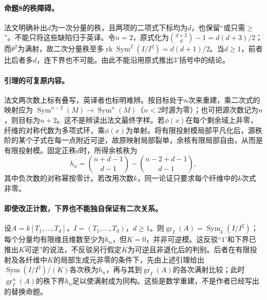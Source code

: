 \documentclass[openany,fontset=fandol]{ctexbook}
\newcommand{\Sym}{\operatorname{Sym}}
\newcommand{\gr}{\operatorname{gr}}
\begin{document}
\paragraph{命题8的秩障碍。}
法文明确补出$d$为一次分量的秩，且两项的二项式下标均为$d$，也保留“或只需$\ge$”。不能只将这些缺陷归于英译。令$n=2$，原式化为$\binom{d+2}{d}-1=d(d+3)/2$；而$\theta^2$为满射，故二次分量秩至多$\operatorname{rk}\Sym^2(I/I^2)=d(d+1)/2$。当$d\ge1$，前者比后者多$d$，连下界也不可能。由此不能沿用原式推出$3^\circ$括号中的结论。

\paragraph{引理的可复原内容。}
法文两次数上标有叠写，英译者也标明难辨。按目标处于$n$次来重建，乘二次式的映射应为
$\Sym^{n-2}(M)\to\Sym^n(M)$（$n<2$时源为零）；也可把源次数记为$n$，则目标为$n+2$。这不是辨读出法文最终字样。若$\phi(x)$在每个剩余域上非零，纤维的对称代数为多项式环，乘$\phi(x)$为单射。将有限投射模局部平凡化后，源秩阶的某个子式在每一点附近可逆，故原映射局部裂单，余核有限局部自由，从而是有限投射模。固定正秩$d$时，所得余核秩为
\[
h_n=\binom{n+d-1}{d-1}-\binom{n-2+d-1}{d-1},
\]
其中负次数的对称幂按零计。若改用次数$k$，同一论证只要求每个纤维中的$k$次式非零。

\paragraph{即使改正计数，下界也不能独自保证有二次关系。}
设$A=k[T_1,\dots,T_d]$，$I=(T_1,\dots,T_d)$，$d\ge1$。则$\gr_I(A)=\Sym_k(I/I^2)$；每个分量均有限维且维数至少为$h_n$，但$K=0$，并非可逆模。这反驳“$1^\circ$和下界已推出$K$可逆”的说法，不反驳另行假定$K$为可逆且非退化后的判别。后者在有限投射及各纤维中$K$的局部生成元非零的条件下，先由上述引理给出$\Sym(I/I^2)/(K)$各次秩为$h_n$，再与其到$\gr_I(A)$的各次满射比较；此时$\gr_I^n(A)$的秩下界$h_n$足以使满射成为同构。这些是数学重建，不是作者已经写出的替换命题。
\end{document}

